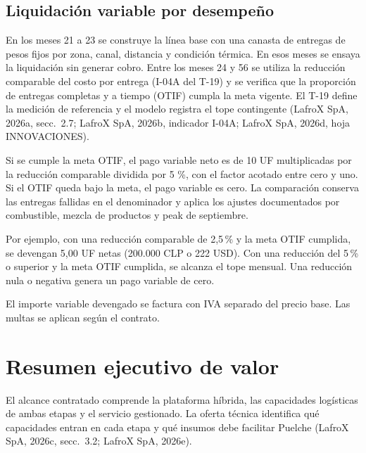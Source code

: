 \subsection{Liquidación variable por desempeño}
En los meses 21 a 23 se construye la línea base con una canasta de entregas de pesos fijos por zona, canal, distancia y condición térmica. En esos meses se ensaya la liquidación sin generar cobro. Entre los meses 24 y 56 se utiliza la reducción comparable del costo por entrega (I-04A del T-19) y se verifica que la proporción de entregas completas y a tiempo (OTIF) cumpla la meta vigente. El T-19 define la medición de referencia y el modelo registra el tope contingente (LafroX SpA, 2026a, secc.~2.7; LafroX SpA, 2026b, indicador I-04A; LafroX SpA, 2026d, hoja INNOVACIONES).

Si se cumple la meta OTIF, el pago variable neto es de 10 UF multiplicadas por la reducción comparable dividida por 5 \%, con el factor acotado entre cero y uno. Si el OTIF queda bajo la meta, el pago variable es cero. La comparación conserva las entregas fallidas en el denominador y aplica los ajustes documentados por combustible, mezcla de productos y peak de septiembre.

Por ejemplo, con una reducción comparable de 2,5\,\% y la meta OTIF cumplida, se devengan 5,00 UF netas (200.000 CLP o 222 USD). Con una reducción del 5\,\% o superior y la meta OTIF cumplida, se alcanza el tope mensual. Una reducción nula o negativa genera un pago variable de cero.

El importe variable devengado se factura con IVA separado del precio base. Las multas se aplican según el contrato.

\section{Resumen ejecutivo de valor}
El alcance contratado comprende la plataforma híbrida, las capacidades logísticas de ambas etapas y el servicio gestionado. La oferta técnica identifica qué capacidades entran en cada etapa y qué insumos debe facilitar Puelche (LafroX SpA, 2026c, secc.~3.2; LafroX SpA, 2026e).
